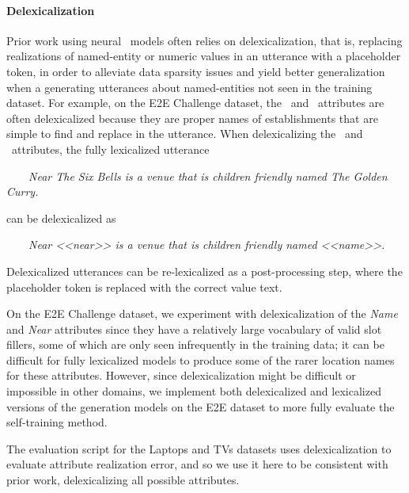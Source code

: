 

\paragraph{Delexicalization}
Prior work using neural \naturallanguagegeneration~models often relies on
delexicalization, that is, replacing realizations of named-entity or numeric
values in an utterance with a placeholder token, in order to alleviate data
sparsity issues and yield better generalization when a generating utterances
about named-entities not seen in the training dataset. For example, on the E2E
Challenge dataset, the ~and ~attributes are often
delexicalized because they are proper names of establishments that are simple
to find and replace in the utterance.  When delexicalizing the ~and
~attributes, the fully lexicalized utterance 

\begin{center}\noindent~~~~\textit{Near The Six Bells is a venue that is children
friendly named The Golden Curry.}\end{center}

\noindent can be delexicalized as

\begin{center}\noindent ~~~~\textit{Near <<near>> is a venue that is children
friendly named <<name>>.}\end{center}

\noindent Delexicalized utterances can be re-lexicalized as a post-processing
step, where the placeholder token is replaced with the correct value text.

On the E2E Challenge dataset, we experiment with delexicalization of the
\textit{Name} and \textit{Near} attributes since they have a relatively large
vocabulary of valid slot fillers, some of which are only seen  infrequently in
the training data; it can be difficult for fully lexicalized models to produce
some of the rarer location names for these attributes.  However, since
delexicalization might be difficult or impossible in other domains, we
implement both delexicalized and lexicalized versions of the generation models
on the E2E dataset to more fully evaluate the self-training method.
   
The evaluation script for the Laptops and TVs datasets uses delexicalization to
evaluate attribute realization error, and so we use it here to be consistent
with prior work, delexicalizing all possible attributes.

